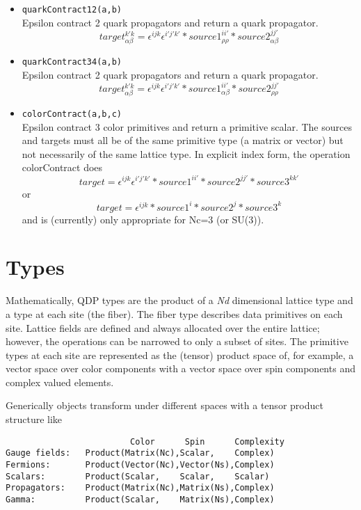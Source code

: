 \documentclass[12pt,letterpaper]{article}
\begin{document}
\begin{itemize}
\item
\verb|quarkContract12(a,b)|\\
Epsilon contract 2 quark propagators and return a quark propagator.
$$target^{k' k}_{\alpha\beta} =
    \epsilon^{i j k}\epsilon^{i' j' k'}*source1^{i i'}_{\rho\rho}*source2^{j j'}_{\alpha\beta}$$

\item
\verb|quarkContract34(a,b)|\\
Epsilon contract 2 quark propagators and return a quark propagator.
$$target^{k' k}_{\alpha\beta} =
    \epsilon^{i j k}\epsilon^{i' j' k'}*source1^{i i'}_{\alpha\beta}*source2^{j j'}_{\rho\rho}$$

\item
\verb|colorContract(a,b,c)|\\
Epsilon contract 3 color primitives and return a primitive scalar.
The sources and targets must all be of the same primitive type (a matrix or vector)
but not necessarily of the same lattice type. In
explicit index form, the operation  colorContract does
$$
target =
  \epsilon^{i j k}\epsilon^{i' j' k'}* source1^{i i'}* source2^{j j'}*source3^{k k'}
$$
or
$$
target =
 \epsilon^{i j k}* source1^{i}* source2^{j}*source3^{k}
$$
and is (currently) only appropriate for Nc=3  (or SU(3)).

\end{itemize}

\bigskip


\newpage
\section{Types}

Mathematically, QDP types are the product of a {\em Nd} dimensional
lattice type and a type at each site (the fiber). The fiber type
describes data primitives on each site.  Lattice fields are defined
and always allocated over the entire lattice; however, the operations
can be narrowed to only a subset of sites.  The primitive types at
each site are represented as the (tensor) product space of, for
example, a vector space over color components with a vector space over
spin components and complex valued elements.

Generically objects transform under different spaces with a tensor
product structure like

\begin{verbatim}
                         Color      Spin      Complexity
Gauge fields:   Product(Matrix(Nc),Scalar,    Complex)
Fermions:       Product(Vector(Nc),Vector(Ns),Complex)
Scalars:        Product(Scalar,    Scalar,    Scalar)
Propagators:    Product(Matrix(Nc),Matrix(Ns),Complex)
Gamma:          Product(Scalar,    Matrix(Ns),Complex)
\end{verbatim}
\end{document}
